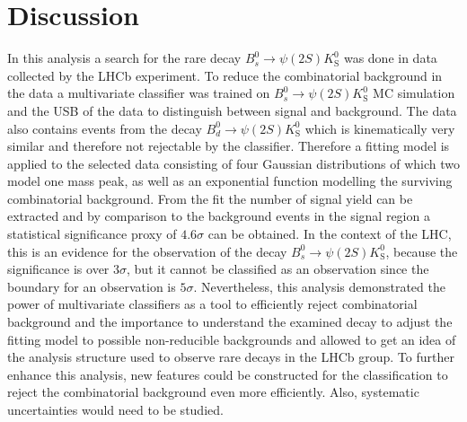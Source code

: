 \section{Discussion}
\label{sec:Diskussion}
In this analysis a search for the rare decay $B^0_s \to \psi(2S)K^0_\mathrm{S}$ was done in data collected by the LHCb experiment. To reduce the combinatorial background in the data a multivariate classifier was trained on $B^0_s \to \psi(2S)K^0_\mathrm{S}$ MC simulation and the USB of the data to distinguish between signal and background. The data also contains events from the decay $B^0_d \to \psi(2S)K^0_\mathrm{S}$ which is kinematically very similar and therefore not rejectable by the classifier.
Therefore a fitting model is applied to the selected data consisting of four Gaussian distributions of which two model one mass peak, as well as an exponential function modelling the surviving combinatorial background. From the fit the number of signal yield can be extracted and by comparison to the background events in the signal region a statistical significance proxy of $\num{4.6}\sigma$ can be obtained.
In the context of the LHC, this is an evidence for the observation of the decay $B^0_s \to \psi(2S)K^0_\mathrm{S}$, because the significance is over $\num{3}\sigma$, but it cannot be classified as an observation since the boundary for an observation is $\num{5}\sigma$.
Nevertheless, this analysis demonstrated the power of multivariate classifiers as a tool to efficiently reject combinatorial background and the importance to understand the examined decay to adjust the fitting model to possible non-reducible backgrounds and allowed to get an idea of the analysis structure used to observe rare decays in the LHCb group.
To further enhance this analysis, new features could be constructed for the classification to reject the combinatorial background even more efficiently. Also, systematic uncertainties would need to be studied.
